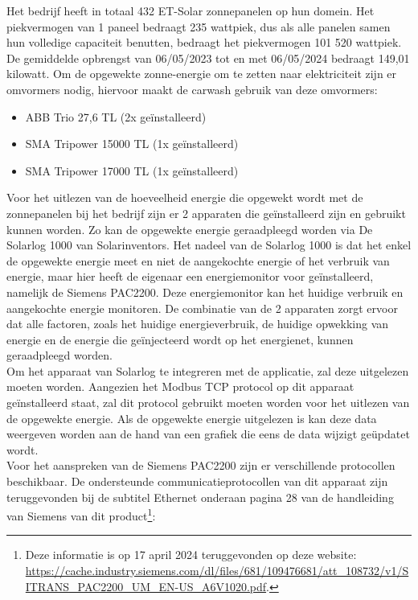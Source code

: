 Het bedrijf heeft in totaal 432 ET-Solar zonnepanelen op hun domein. Het piekvermogen van 1 paneel bedraagt 235 wattpiek, dus als alle panelen samen hun volledige capaciteit benutten, bedraagt het piekvermogen 101 520 wattpiek. De gemiddelde opbrengst van 06/05/2023 tot en met 06/05/2024 bedraagt 149,01 kilowatt. Om de opgewekte zonne-energie om te zetten naar elektriciteit zijn er omvormers nodig, hiervoor maakt de carwash gebruik van deze omvormers:

\begin{itemize}
    \item ABB Trio 27,6 TL (2x geïnstalleerd)
    \item SMA Tripower 15000 TL (1x geïnstalleerd)
    \item SMA Tripower 17000 TL (1x geïnstalleerd)
\end{itemize}

Voor het uitlezen van de hoeveelheid energie die opgewekt wordt met de zonnepanelen bij het bedrijf zijn er 2 apparaten die geïnstalleerd zijn en gebruikt kunnen worden. Zo kan de opgewekte energie geraadpleegd worden via De Solarlog 1000 van Solarinventors. Het nadeel van de Solarlog 1000 is dat het enkel de opgewekte energie meet en niet de aangekochte energie of het verbruik van energie, maar hier heeft de eigenaar een energiemonitor voor geïnstalleerd, namelijk de Siemens PAC2200. Deze energiemonitor kan het huidige verbruik en aangekochte energie monitoren. De combinatie van de 2 apparaten zorgt ervoor dat alle factoren, zoals het huidige energieverbruik, de huidige opwekking van energie en de energie die geïnjecteerd wordt op het energienet, kunnen geraadpleegd worden.\\

Om het apparaat van Solarlog te integreren met de applicatie, zal deze uitgelezen moeten worden. Aangezien het Modbus TCP protocol op dit apparaat geïnstalleerd staat, zal dit protocol gebruikt moeten worden voor het uitlezen van de opgewekte energie. Als de opgewekte energie uitgelezen is kan deze data weergeven worden aan de hand van een grafiek die eens de data wijzigt geüpdatet wordt.\\

Voor het aanspreken van de Siemens PAC2200 zijn er verschillende protocollen beschikbaar. De ondersteunde communicatieprotocollen van dit apparaat zijn teruggevonden bij de subtitel Ethernet onderaan pagina 28 van de handleiding van Siemens van dit product\footnote{Deze informatie is op 17 april 2024 teruggevonden op deze website: \url{https://cache.industry.siemens.com/dl/files/681/109476681/att_108732/v1/SITRANS_PAC2200_UM_EN-US_A6V1020.pdf}.}:

